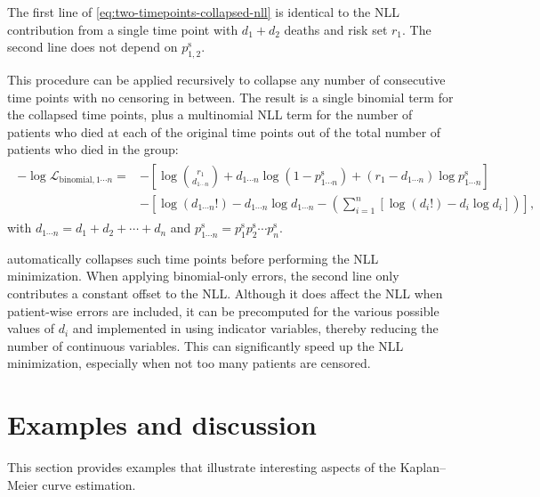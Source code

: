 \documentclass[article]{jss}
\newcommand{\KM}{Kaplan--Meier} %
\begin{document}
The first line of \cref{eq:two-timepoints-collapsed-nll} is identical to the NLL contribution from a single time point with \(d_1+d_2\) deaths and risk set \(r_1\)\@. The second line does not depend on \(p_{1,2}^\text{s}\).

This procedure can be applied recursively to collapse any number of consecutive time points with no censoring in between. The result is a single binomial term for the collapsed time points, plus a multinomial NLL term for the number of patients who died at each of the original time points out of the total number of patients who died in the group:
\begin{align}
\begin{aligned}
-\log \mathcal{L}_{\text{binomial},1 \cdots n} =&-\left[\log\binom{r_1}{d_{1 \cdots n}} + d_{1 \cdots n} \log \left(1-p_{1 \cdots n}^\text{s}\right) + (r_1-d_{1 \cdots n}) \log p_{1 \cdots n}^\text{s}\right] \\
&-\left[\log{(d_{1 \cdots n}!)}-d_{1 \cdots n}\log d_{1 \cdots n} - \left(\sum_{i=1}^n \left[\log{(d_i!)} - d_i \log d_i\right]\right)\right],
\end{aligned}
\end{align}
with \(d_{1 \cdots n} = d_1 + d_2 + \cdots + d_n\) and \(p_{1 \cdots n}^\text{s} = p_1^\text{s} p_2^\text{s} \cdots p_n^\text{s}\)\@.

 automatically collapses such time points before performing the NLL minimization. When applying binomial-only errors, the second line only contributes a constant offset to the NLL\@. Although it does affect the NLL when patient-wise errors are included, it can be precomputed for the various possible values of \(d_i\) and implemented in  using indicator variables, thereby reducing the number of continuous variables. This can significantly speed up the NLL minimization, especially when not too many patients are censored.

\section{Examples and discussion}

This section provides examples that illustrate interesting aspects of the \KM{} curve estimation.
\end{document}
